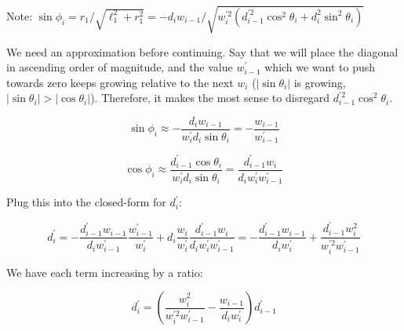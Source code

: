 \documentclass{article}
\begin{document}
Note: $\sin \phi_i = r_1 / \sqrt{\ell_1^2 + r_1^2}
= -d_i w_{i-1} / \sqrt{w_i^{\prime 2} (d_{i-1}^{\prime2} \cos^2 \theta_i + d_i^2 \sin^2 \theta_i)}
$

We need an approximation before continuing. Say that we will place the diagonal in ascending order of magnitude, and the value $w_{i-1}^\prime$ which we want to push towards zero keeps growing relative to the next $w_i$ ($|\sin\theta_i|$ is growing, $|\sin\theta_i| > |\cos\theta_i|$). Therefore, it makes the most sense to disregard $d_{i-1}^{\prime2} \cos^2\theta_i$.

$$
\sin \phi_i
\approx
-\frac{d_iw_{i-1}}{
	w_i^\prime d_i \sin\theta_i
}
=
-\frac{w_{i-1}}{w_{i-1}^\prime}
$$

$$
\cos \phi_i
\approx
\frac{d_{i-1}^\prime \cos\theta_i}{w_i^\prime d_i \sin\theta_i}
=
\frac{d_{i-1}^\prime w_i}{d_i w_i^\prime w_{i-1}^\prime}
$$

Plug this into the closed-form for $d_i^\prime$:

$$
d_i^\prime
=
-\frac{d_{i-1}^\prime w_{i-1}}{d_i w_{i-1}^\prime} \frac{w_{i-1}^\prime}{w_i^\prime}
+
d_i \frac{w_i}{w_i^\prime} \frac{d_{i-1}^\prime w_i}{d_i w_i^\prime w_{i-1}^\prime}
=
-\frac{d_{i-1}^\prime w_{i-1}}{d_i w_i^\prime} + \frac{d_{i-1}^\prime w_i^2}{w_i^{\prime 2} w_{i-1}^\prime}
$$

We have each term increasing by a ratio:

$$
d_i^\prime = \left( \frac{w_i^2}{w_i^{\prime2} w_{i-1}^\prime} - \frac{w_{i-1}}{d_i w_i^\prime} \right) d_{i-1}^\prime
$$

\end{document}
